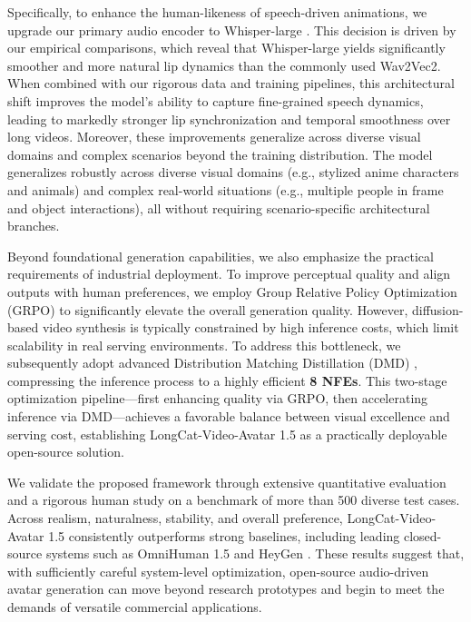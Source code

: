 Specifically, to enhance the human-likeness of speech-driven animations, we upgrade our primary audio encoder to Whisper-large \cite{radford2022whisper}. This decision is driven by our empirical comparisons, which reveal that Whisper-large yields significantly smoother and more natural lip dynamics than the commonly used Wav2Vec2. When combined with our rigorous data and training pipelines, this architectural shift improves the model's ability to capture fine-grained speech dynamics, leading to markedly stronger lip synchronization and temporal smoothness over long videos. Moreover, these improvements generalize across diverse visual domains and complex scenarios beyond the training distribution. The model generalizes robustly across diverse visual domains (e.g., stylized anime characters and animals) and complex real-world situations (e.g., multiple people in frame and object interactions), all without requiring scenario-specific architectural branches.

Beyond foundational generation capabilities, we also emphasize the practical requirements of industrial deployment. To improve perceptual quality and align outputs with human preferences, we employ Group Relative Policy Optimization (GRPO) to significantly elevate the overall generation quality. However, diffusion-based video synthesis is typically constrained by high inference costs, which limit scalability in real serving environments. To address this bottleneck, we subsequently adopt advanced Distribution Matching Distillation (DMD) \cite{yin2024improved}, compressing the inference process to a highly efficient \textbf{8 NFEs}. This two-stage optimization pipeline—first enhancing quality via GRPO, then accelerating inference via DMD—achieves a favorable balance between visual excellence and serving cost, establishing LongCat-Video-Avatar 1.5 as a practically deployable open-source solution.

We validate the proposed framework through extensive quantitative evaluation and a rigorous human study on a benchmark  \cite{zhou2025evaltalker} of more than 500 diverse test cases. Across realism, naturalness, stability, and overall preference, LongCat-Video-Avatar 1.5 consistently outperforms strong baselines, including leading closed-source systems such as OmniHuman 1.5 \cite {jiang2025omnihuman} and HeyGen \cite{HeyGen}. These results suggest that, with sufficiently careful system-level optimization, open-source audio-driven avatar generation can move beyond research prototypes and begin to meet the demands of versatile commercial applications.




